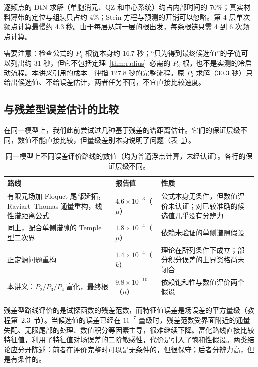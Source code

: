 \documentclass[11pt,a4paper,fontset=fandol]{ctexart}
\begin{document}
逐频点的 DtN 求解（单胞消元、QZ 和中心系统）约占内部时间的 70\%；真实材料薄带的定位与组装只占约 4\%；Stein 方程与预测的开销可以忽略。第 4 层单次频点计算最慢约 4.3 秒。由于每层从前一层的根出发，每条根链只需 4 到 6 次频点计算。

需要注意：检查公式的 $P_4$ 根链本身约 16.7 秒；“只为得到最终候选值”的子链可以列出约 31 秒，但它不包括定理~\ref{thm:radius}~必需的 $P_3$ 根，也不是实测的冷启动流程。本讲义引用的成本一律指 127.8 秒的完整流程。原 $P_2$ 求解（30.3 秒）只给出候选值、不给误差估计，两者任务不同，不宜直接比较速度。

\subsection{与残差型误差估计的比较}
\label{sec:compare}

在同一模型上，我们此前尝试过几种基于残差的谱距离估计。它们的保证层级不同，数值不能直接比较，但量级差别本身说明了问题（表~\ref{tab:compare}）。

\begin{table}[ht]
\centering
\caption{同一模型上不同误差评价路线的数值（均为普通浮点计算，未经认证）。各行的保证层级不同。}
\label{tab:compare}
\begin{tabular}{p{4.6cm}p{2.6cm}p{6.2cm}}
\toprule
路线 & 报告值 & 性质 \\
\midrule
有限元场加 Floquet 尾部延拓，Raviart--Thomas 通量重构，线性谱距离公式 & $4.6\times10^{-3}$（$\mu$） & 公式本身无条件，但数值评价未认证；对已较准确的候选值几乎没有分辨力 \\
同上，配合单侧谱隙的 Temple 型二次界 & $1.8\times10^{-4}$（$\mu$） & 依赖未验证的单侧谱隙假设 \\
正定源问题重构 & $1.4\times10^{-4}$（$k$） & 理论在所列条件下成立；部分积分误差的上界资格尚未闭合 \\
本讲义：$P_2/P_3/P_4$ 富化，最终根 & $9.8\times10^{-10}$（$\mu$） & 依赖饱和性与数值评价两个假设 \\
\bottomrule
\end{tabular}
\end{table}

残差型路线评价的是试探函数的残差范数，而特征值误差是场误差的平方量级（教程第~2.3~节）。当候选值的误差已经在 $10^{-7}$ 量级时，残差范数受界面附近的通量失配、无限尾部的处理、数值积分等因素主导，很难继续下降。富化路线直接比较特征值，利用了特征值对场误差的二阶敏感性，代价是引入了饱和性假设。两类结论应分开陈述：前者在评价完整时可以是无条件的，但很保守；后者分辨力高，但是有条件的。
\end{document}
